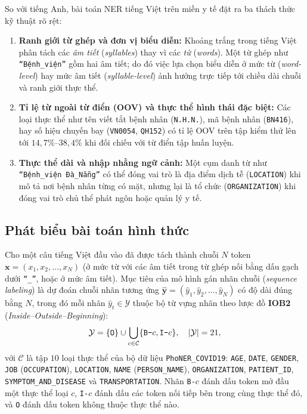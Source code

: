 \documentclass[11pt,a4paper,twocolumn]{article}
\begin{document}
So với tiếng Anh, bài toán NER tiếng Việt trên miền y tế đặt ra ba thách thức kỹ thuật rõ rệt:
\begin{enumerate}
  \item \textbf{Ranh giới từ ghép và đơn vị biểu diễn:} Khoảng trắng trong tiếng Việt phân tách các \textit{âm tiết} (\textit{syllables}) thay vì các \textit{từ} (\textit{words}). Một từ ghép như \texttt{``Bệnh\_viện''} gồm hai âm tiết; do đó việc lựa chọn biểu diễn ở mức từ (\textit{word-level}) hay mức âm tiết (\textit{syllable-level}) ảnh hưởng trực tiếp tới chiều dài chuỗi và ranh giới thực thể.
  \item \textbf{Tỉ lệ từ ngoài từ điển (OOV) và thực thể hình thái đặc biệt:} Các loại thực thể như tên viết tắt bệnh nhân (\texttt{N.H.N.}), mã bệnh nhân (\texttt{BN416}), hay số hiệu chuyến bay (\texttt{VN0054}, \texttt{QH152}) có tỉ lệ OOV trên tập kiểm thử lên tới $14{,}7\%$--$38{,}4\%$ khi đối chiếu với từ điển tập huấn luyện.
  \item \textbf{Thực thể dài và nhập nhằng ngữ cảnh:} Một cụm danh từ như \texttt{``Bệnh\_viện Đà\_Nẵng''} có thể đóng vai trò là địa điểm dịch tễ (\texttt{LOCATION}) khi mô tả nơi bệnh nhân từng có mặt, nhưng lại là tổ chức (\texttt{ORGANIZATION}) khi đóng vai trò chủ thể phát ngôn hoặc quản lý y tế.
\end{enumerate}

\subsection{Phát biểu bài toán hình thức}
Cho một câu tiếng Việt đầu vào đã được tách thành chuỗi $N$ token $\mathbf{x} = (x_1, x_2, \dots, x_N)$ (ở mức từ với các âm tiết trong từ ghép nối bằng dấu gạch dưới \texttt{``\_''}, hoặc ở mức âm tiết). Mục tiêu của mô hình gán nhãn chuỗi (\textit{sequence labeling}) là dự đoán chuỗi nhãn tương ứng $\hat{\mathbf{y}} = (\hat{y}_1, \hat{y}_2, \dots, \hat{y}_N)$ có độ dài đúng bằng $N$, trong đó mỗi nhãn $\hat{y}_t \in \mathcal{Y}$ thuộc bộ từ vựng nhãn theo lược đồ \textbf{IOB2} (\textit{Inside--Outside--Beginning}):
\begin{equation}
  \mathcal{Y} = \{\text{\texttt{O}}\} \cup \bigcup_{c \in \mathcal{C}} \{\text{\texttt{B-}}c, \text{\texttt{I-}}c\}, \quad |\mathcal{Y}| = 21,
\end{equation}
với $\mathcal{C}$ là tập $10$ loại thực thể của bộ dữ liệu \texttt{PhoNER\_COVID19}: \texttt{AGE}, \texttt{DATE}, \texttt{GENDER}, \texttt{JOB} (\texttt{OCCUPATION}), \texttt{LOCATION}, \texttt{NAME} (\texttt{PERSON\_NAME}), \texttt{ORGANIZATION}, \texttt{PATIENT\_ID}, \texttt{SYMPTOM\_AND\_DISEASE} và \texttt{TRANSPORTATION}. Nhãn \texttt{B-}$c$ đánh dấu token mở đầu một thực thể loại $c$, \texttt{I-}$c$ đánh dấu các token nối tiếp bên trong cùng thực thể đó, và \texttt{O} đánh dấu token không thuộc thực thể nào.
\end{document}
